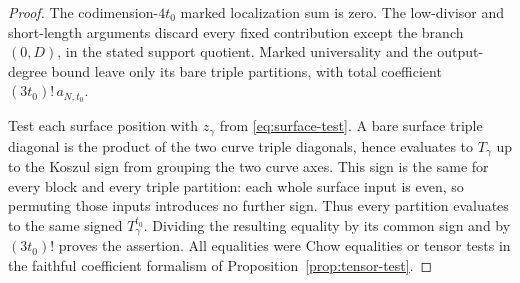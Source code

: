 \begin{proof}
The codimension-\(4t_0\) marked localization sum is zero.
The low-divisor and short-length arguments discard every fixed
contribution except the branch \((0,D)\), in the stated support
quotient. Marked universality and the output-degree bound leave only
its bare triple partitions, with total coefficient
\((3t_0)!\,a_{N,t_0}\).

Test each surface position with \(z_\gamma\) from
\eqref{eq:surface-test}. A bare surface triple diagonal is the
product of the two curve triple diagonals, hence evaluates to
\(T_\gamma\) up to the Koszul sign from grouping the two curve axes.
This sign is the same for every block and every triple partition:
each whole surface input is even, so permuting those inputs
introduces no further sign. Thus every partition evaluates to the
same signed \(T_\gamma^{t_0}\).
Dividing the resulting equality by its common sign and by
\((3t_0)!\) proves the assertion.
All equalities were Chow equalities or tensor tests in the faithful
coefficient formalism of Proposition~\ref{prop:tensor-test}.
\end{proof}
